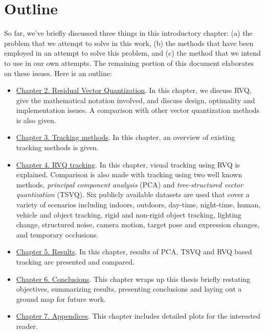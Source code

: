\section{Outline}
So far, we've briefly discussed three things in this introductory chapter: (a) the problem that we attempt to solve in this work, (b) the methods that have been employed in an attempt to solve this problem, and (c) the method that we intend to use in our own attempts.  The remaining portion of this document elaborates on these issues.  Here is an outline:

\begin{itemize}
\item \underline{Chapter 2.  Residual Vector Quantization}.  In this chapter, we discuss RVQ, give the mathematical notation involved, and discuss design, optimality and implementation issues.  A comparison with other vector quantization methods is also given.
\item \underline{Chapter 3.  Tracking methods}.  In this chapter, an overview of existing tracking methods is given.
\item \underline{Chapter 4.  RVQ tracking}.  In this chapter, visual tracking using RVQ is explained.  Comparison is also made with tracking using two well known methods, \emph{principal component analysis} (PCA) and \emph{tree-structured vector quantization} (TSVQ).  Six publicly available datasets are used that cover a variety of scenarios including indoors, outdoors, day-time, night-time, human, vehicle and object tracking, rigid and non-rigid object tracking, lighting change, structured noise, camera motion, target pose and expression changes, and temporary occlusions.  
\item \underline{Chapter 5.  Results}.  In this chapter, results of PCA, TSVQ and RVQ based tracking are presented and compared.
\item \underline{Chapter 6.  Conclusions}.  This chapter wraps up this thesis briefly restating objectives, summarizing results, presenting conclusions and laying out a ground map for future work.
\item \underline{Chapter 7.  Appendices}.  This chapter includes detailed plots for the interested reader.
\end{itemize}










